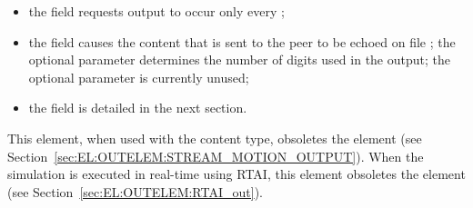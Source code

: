 \begin{itemize}
\item the field  requests output to occur
only every ;

\item the field  causes the content that is sent to the peer
to be echoed on file ; the optional parameter 
determines the number of digits used in the output; the optional parameter
 is currently unused;

\item the field  is detailed in the next section.
\end{itemize}
This element, when used with the  content type,
obsoletes the  element
(see Section~\ref{sec:EL:OUTELEM:STREAM_MOTION_OUTPUT}).
When the simulation is executed in real-time using RTAI,
this element obsoletes the  element
(see Section~\ref{sec:EL:OUTELEM:RTAI_out}).



